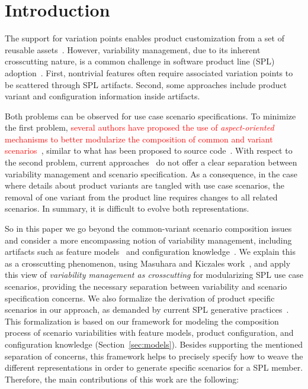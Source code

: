 \section{Introduction}
The support for variation points enables product customization from a set of
reusable assets~\cite{Pohl:2005aa}. However, variability management, due to its
inherent crosscutting nature, is a common challenge in software product line
(SPL) adoption~\cite{Clements:2001aa,Pohl:2005aa}. First, nontrivial features
often require associated variation points to be scattered through SPL artifacts.
Second, some approaches include product variant and configuration information
inside artifacts.

Both problems can be observed for use case scenario specifications. To minimize
the first problem, \textcolor{red}{several authors have proposed the use of
\emph{aspect-oriented} mechanisms to better modularize the composition of common
and variant scenarios~\cite{moreira-re07,eriksson-splc-2005,pohl-caise-2005}},
similar to what has been proposed to source code~\cite{alves-gpce-06,
apel-icse2006}. With respect to the second problem, current
approaches~\cite{favaro-icsr-98,Bertolino:2003aa,Eriksson:2005aa} do not offer a
clear separation between variability management and scenario specification. As a
consequence, in the case where details about product variants are tangled with
use case scenarios, the removal of one variant from the product line requires
changes to all related scenarios. In summary, it is difficult to evolve both
representations.

So in this paper we go beyond the common-variant scenario composition issues and
consider a more encompassing notion of variability management, including
artifacts such as feature models~\cite{gheyi-alloy-06,Czarnecki:2000aa} and
configuration knowledge~\cite{Czarnecki:2000aa,Pohl:2005aa}. We explain this as a
crosscutting phenomenon, using Masuhara and Kiczales work~\cite{Masuhara:2003aa},
and apply this view of \emph{variability management as crosscutting} for
modularizing SPL use case scenarios, providing the necessary separation between
variability and scenario specification concerns. We also formalize the derivation
of product specific scenarios in our approach, as demanded by current SPL
generative practices~\cite{krueger-cacm-200712}. This formalization is based on
our framework for modeling the composition process of scenario variabilities with
feature models, product configuration, and configuration knowledge
(Section~\ref{sec:models}). Besides supporting the mentioned separation of
concerns, this framework helps to precisely specify how to weave the different
representations in order to generate specific scenarios for a SPL member.
Therefore, the main contributions of this work are the following:

